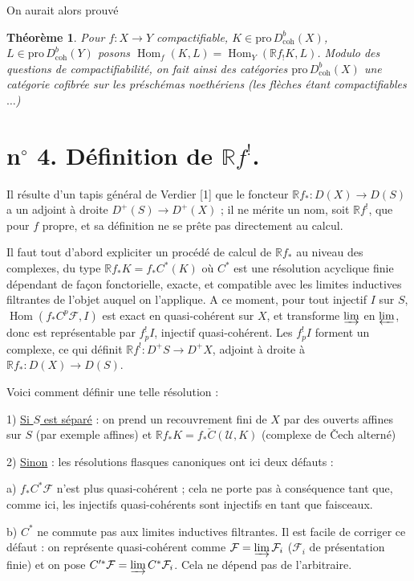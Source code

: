 \documentclass[12pt]{amsart}
\theoremstyle{plain}
\newtheorem{thm}[prop]{Théorème}
\theoremstyle{definition}
\DeclareMathOperator{\Hom}{Hom}
\newcommand{\Pro}{\text{pro}\,}
\newcommand{\coh}{\text{coh}}
\newcommand{\cF}{\mathcal{F}}
\newcommand{\cU}{\mathcal{U}}
\newcommand{\cDb}{D^{b}}
\newcommand{\cD}{D}
\newcommand{\bR}{\mathbb{R}}
\begin{document}
On aurait alors prouv\'e

\begin{thm}
Pour $f: X \to Y$ compactifiable, $K \in \Pro\cDb_{\coh}(X)$, $L \in \Pro\cDb_{\coh}(Y)$ posons $\Hom_{f}(K,L) = \Hom_{Y}(\bR f_{!}K, L)$. Modulo des questions de compactifiabilit\'e, on fait ainsi des cat\'egories $\Pro\cDb_{\coh}(X)$ une cat\'egorie cofibr\'ee sur les pr\'esch\'emas noeth\'eriens (les fl\`eches \'etant compactifiables $\ldots$)
\end{thm}

\section*{n$^{\circ}$ 4. D\'efinition de $\bR f^{!}$.}

Il r\'esulte d'un tapis g\'en\'eral de Verdier [1] que le foncteur $\bR f_{*}: \cD(X) \to \cD(S)$ a un adjoint \`a droite $\cD^{+}(S) \to \cD^{+}(X)$ ; il ne m\'erite un nom, soit $\bR f^{!}$, que pour $f$ propre, et sa d\'efinition ne se pr\^ete pas directement au calcul.

Il faut tout d'abord expliciter un proc\'ed\'e de calcul de $\bR f_{*}$ au niveau des complexes, du type $\bR f_{*}K = f_{*}C^{*}(K)$ o\`u $C^{*}$ est une r\'esolution acyclique finie d\'ependant de fa\c{c}on fonctorielle, exacte, et compatible avec les limites inductives filtrantes de l'objet auquel on l'applique. A ce moment, pour tout injectif $I$ sur $S$, $\Hom(f_{*}C^{p}\cF, I)$ est exact en quasi-coh\'erent sur $X$, et transforme $\varinjlim$ en $\varprojlim$, donc est repr\'esentable par $f_{p}^{!}I$, injectif quasi-coh\'erent. Les $f_{p}^{!}I$ forment un complexe, ce qui d\'efinit $\bR f^{!}: \cD^{+}S \to \cD^{+}X$, adjoint \`a droite \`a $\bR f_{*}: \cD(X) \to \cD(S)$.

Voici comment d\'efinir une telle r\'esolution :

1) \underline{Si $S$ est s\'epar\'e} : on prend un recouvrement fini de $X$ par des ouverts affines sur $S$ (par exemple affines) et $\bR f_{*}K = f_{*}\check{C}(\cU, K)$ (complexe de \v{C}ech altern\'e)

2) \underline{Sinon} : les r\'esolutions flasques canoniques ont ici deux d\'efauts :

a) $f_{*}C^{*}\cF$ n'est plus quasi-coh\'erent ; cela ne porte pas \`a cons\'equence tant que, comme ici, les injectifs quasi-coh\'erents sont injectifs en tant que faisceaux.

b) $C^{*}$ ne commute pas aux limites inductives filtrantes. Il est facile de corriger ce d\'efaut : on repr\'esente quasi-coh\'erent comme $\cF = \varinjlim \cF_{i}$ ($\cF_{i}$ de pr\'esentation finie) et on pose $C'^{*}\cF = \varinjlim C^{*}\cF_{i}$. Cela ne d\'epend pas de l'arbitraire.
\end{document}
